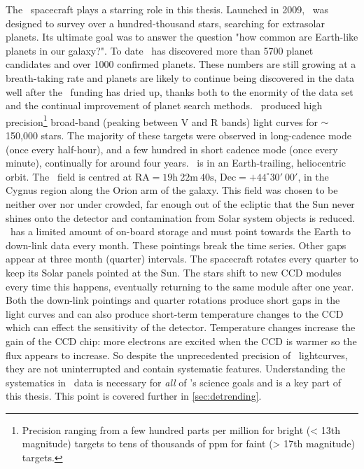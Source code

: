 The \kepler\ spacecraft plays a starring role in this thesis.
Launched in 2009, \kepler\ was designed to survey over a hundred-thousand
stars, searching for extrasolar planets.
Its ultimate goal was to answer the question "how common are Earth-like
planets in our galaxy?".
To date \kepler\ has discovered more than 5700 planet candidates and over 1000
confirmed planets.
These numbers are still growing at a breath-taking rate and planets are likely
to continue being discovered in the data well after the \kepler\ funding has
dried up, thanks both to the enormity of the data set and the continual
improvement of planet search methods.
\kepler\ produced high precision\footnote{Precision ranging from a few hundred
parts per million for bright (< 13th magnitude) targets to tens of thousands
of ppm for faint (> 17th magnitude) targets.} broad-band (peaking between V
and R bands) light curves for $\sim$ 150,000 stars.
The majority of these targets were observed in long-cadence mode (once every
half-hour), and a few hundred in short cadence mode (once every minute),
continually for around four years.
\kepler\ is in an Earth-trailing, heliocentric orbit.
The \kepler\ field is centred at $\mathrm{RA} = 19\mathrm{h}~22\mathrm{m}~
40\mathrm{s}$, $\mathrm{Dec} = +44^\circ30'~00'$, in the Cygnus region along
the Orion arm of the galaxy.
This field was chosen to be neither over nor under crowded, far enough out of
the ecliptic that the Sun never shines onto the detector and contamination
from Solar system objects is reduced.
\kepler\ has a limited amount of on-board storage and must point towards the
Earth to down-link data every month.
These pointings break the time series.
Other gaps appear at three month (quarter) intervals.
The spacecraft rotates every quarter to keep its Solar panels pointed at the
Sun.
The stars shift to new CCD modules every time this happens, eventually
returning to the same module after one year.
Both the down-link pointings and quarter rotations produce short gaps in the
light curves and can also produce short-term temperature changes to the CCD
which can effect the sensitivity of the detector.
Temperature changes increase the gain of the CCD chip: more electrons are
excited when the CCD is warmer so the flux appears to increase.
So despite the unprecedented precision of \kepler\ lightcurves, they are not
uninterrupted and contain systematic features.
Understanding the systematics in \kepler\ data is necessary for {\it all} of
\kepler's science goals and is a key part of this thesis.
This point is covered further in \textsection \ref{sec:detrending}.

